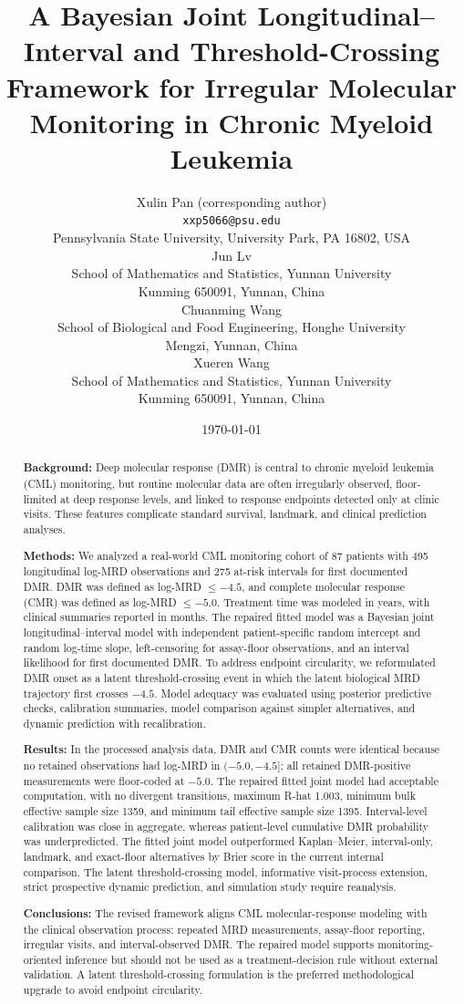\documentclass[11pt]{article}
\title{A Bayesian Joint Longitudinal--Interval and Threshold-Crossing Framework for Irregular Molecular Monitoring in Chronic Myeloid Leukemia}
\author{
Xulin Pan (corresponding author)\\
\texttt{xxp5066@psu.edu}\\
Pennsylvania State University, University Park, PA 16802, USA\\[0.5em]
Jun Lv\\
School of Mathematics and Statistics, Yunnan University\\
Kunming 650091, Yunnan, China\\[0.5em]
Chuanming Wang\\
School of Biological and Food Engineering, Honghe University\\
Mengzi, Yunnan, China\\[0.5em]
Xueren Wang\\
School of Mathematics and Statistics, Yunnan University\\
Kunming 650091, Yunnan, China\\[0.5em]
}
\date{\today}
\begin{document}
\maketitle

\begin{abstract}
\textbf{Background:}
Deep molecular response (DMR) is central to chronic myeloid leukemia (CML) monitoring, but routine molecular data are often irregularly observed, floor-limited at deep response levels, and linked to response endpoints detected only at clinic visits. These features complicate standard survival, landmark, and clinical prediction analyses.

\textbf{Methods:}
We analyzed a real-world CML monitoring cohort of 87 patients with 495 longitudinal log-MRD observations and 275 at-risk intervals for first documented DMR. DMR was defined as log-MRD \(\le -4.5\), and complete molecular response (CMR) was defined as log-MRD \(\le -5.0\). Treatment time was modeled in years, with clinical summaries reported in months. The repaired fitted model was a Bayesian joint longitudinal--interval model with independent patient-specific random intercept and random log-time slope, left-censoring for assay-floor observations, and an interval likelihood for first documented DMR. To address endpoint circularity, we reformulated DMR onset as a latent threshold-crossing event in which the latent biological MRD trajectory first crosses \(-4.5\). Model adequacy was evaluated using posterior predictive checks, calibration summaries, model comparison against simpler alternatives, and dynamic prediction with recalibration.

\textbf{Results:}
In the processed analysis data, DMR and CMR counts were identical because no retained observations had log-MRD in \((-5.0,-4.5]\); all retained DMR-positive measurements were floor-coded at \(-5.0\). The repaired fitted joint model had acceptable computation, with no divergent transitions, maximum R-hat 1.003, minimum bulk effective sample size 1359, and minimum tail effective sample size 1395. Interval-level calibration was close in aggregate, whereas patient-level cumulative DMR probability was underpredicted. The fitted joint model outperformed Kaplan--Meier, interval-only, landmark, and exact-floor alternatives by Brier score in the current internal comparison. The latent threshold-crossing model, informative visit-process extension, strict prospective dynamic prediction, and simulation study require reanalysis.

\textbf{Conclusions:}
The revised framework aligns CML molecular-response modeling with the clinical observation process: repeated MRD measurements, assay-floor reporting, irregular visits, and interval-observed DMR. The repaired model supports monitoring-oriented inference but should not be used as a treatment-decision rule without external validation. A latent threshold-crossing formulation is the preferred methodological upgrade to avoid endpoint circularity.
\end{abstract}
\end{document}
